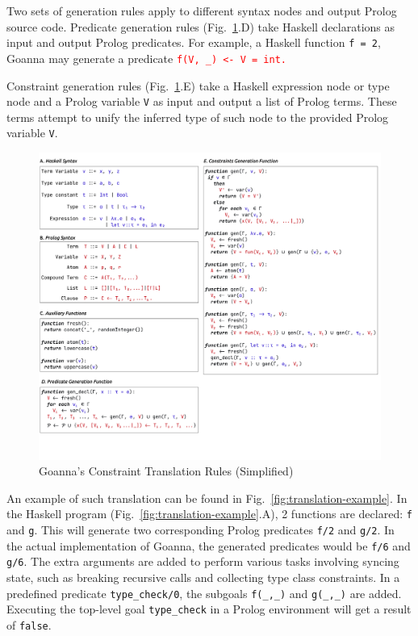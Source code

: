 \documentclass[pdflatex,sn-mathphys-num]{sn-jnl}%
\begin{document}
    Two sets of generation rules apply to different syntax nodes and output Prolog source code. Predicate generation rules (Fig.~\ref{fig:translation}.D) take Haskell declarations as input and output Prolog predicates. For example, a Haskell function \texttt{f = 2}, Goanna may generate a predicate \texttt{\textcolor{red}{f(V, \_) <- V = int.}}
    
    Constraint generation rules (Fig.~\ref{fig:translation}.E) take a Haskell expression node or type node and a Prolog variable \texttt{V} as input and output a list of Prolog terms. These terms attempt to unify the inferred type of such node to the provided Prolog variable \texttt{V}.
    
    \begin{figure}[ht!]
        \centering
        \includegraphics[width=\linewidth,trim={0 6cm 0 0},clip]{images/Generation}
        \caption{Goanna's Constraint Translation Rules (Simplified)} 
        \label{fig:translation}
    \end{figure}
    
  
    An example of such translation can be found in Fig.~\ref{fig:translation-example}. In the Haskell program (Fig.~\ref{fig:translation-example}.A), 2 functions are declared: \texttt{f} and \texttt{g}. This will generate two corresponding Prolog predicates \texttt{f/2} and \texttt{g/2}. In the actual implementation of Goanna, the generated predicates would be \texttt{f/6} and \texttt{g/6}. The extra arguments are added to perform various tasks involving syncing state, such as breaking recursive calls and collecting type class constraints. In a predefined predicate \texttt{type\_check/0}, the subgoals \texttt{f(\_,\_)} and \texttt{g(\_,\_)} are added. Executing the top-level goal \texttt{type\_check} in a Prolog environment will get a result of \texttt{false}.
    
\end{document}
